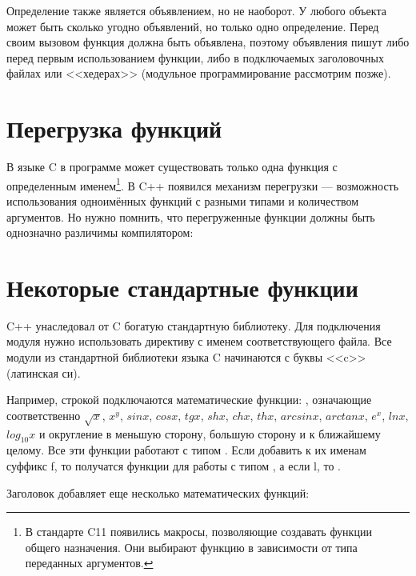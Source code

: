 \documentclass[book.tex]{subfiles}
\begin{document}
Определение также является объявлением, но не наоборот. У любого объекта может быть сколько угодно объявлений, но только одно определение. Перед своим вызовом функция должна быть объявлена, поэтому объявления пишут либо перед первым использованием функции, либо в подключаемых заголовочных файлах или <<хедерах>> (модульное программирование рассмотрим позже).


\section*{Перегрузка функций}

В языке C в программе может существовать только одна функция с определенным именем\footnote{В стандарте C11 появились макросы, позволяющие создавать функции общего назначения. Они выбирают функцию в зависимости от типа переданных аргументов.}. В C++ появился механизм перегрузки --- возможность использования одноимённых функций с разными типами и количеством аргументов. Но нужно помнить, что перегруженные функции должны быть однозначно различимы компилятором:


\section*{Некоторые стандартные функции}

C++ унаследовал от C богатую стандартную библиотеку. Для подключения модуля нужно использовать директиву  с именем соответствующего файла. Все модули из стандартной библиотеки языка C начинаются с буквы <<c>> (латинская си).

Например, строкой  подключаются математические функции: , означающие соответственно $\sqrt x$, $x^y$, $sin x$, $cos x$, $tg x$, $sh x$, $ch x$, $th x$, $arcsin x$, $arctan x$, $e^x$, $ln x$, $log_{10}x$ и округление в меньшую сторону, большую сторону и к ближайшему целому. Все эти функции работают с типом . Если добавить к их именам суффикс f, то получатся функции для работы с типом , а если l, то .

Заголовок  добавляет еще несколько математических функций:
\end{document}
